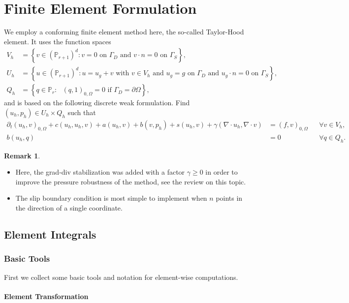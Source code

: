 \documentclass[a4paper,
		     12pt,
		     DIV10,
		     DIVcalc,
		     headings=normal,
		     oneside,
		     bibliography=totoc,
		     headsepline=false,
		     headinclude]{scrartcl}
\theoremstyle{definition}
\newtheorem{Rem}[Def]{Remark}
\begin{document}
\section{Finite Element Formulation}

We employ a conforming finite element method here, the so-called Taylor-Hood element. It uses the function spaces
\begin{align}
V_h &= \left\{ v\in (\mathbb{P}_{r+1})^d : \text{$v=0$ on $\Gamma_D$ and $v\cdot n=0$ on $\Gamma_S$} \right\},\\
U_h &= \left\{ u\in (\mathbb{P}_{r+1})^d : \text{$u=u_g+v$ with $v\in V_h$ and $u_g=g$ on $\Gamma_D$ and $u_g\cdot n=0$ on $\Gamma_S$} \right\},\\
Q_h &= \left\{ q\in \mathbb{P}_r : \text{ $(q,1)_{0,\Omega}=0$ if $\Gamma_D=\partial\Omega$} \right\},
\end{align}
and is based on the following discrete weak formulation. Find $(u_h,p_h)\in U_h\times Q_h$ such that
\begin{align}
\partial_t (u_h,v)_{0,\Omega} + c(u_h,u_h,v) + a(u_h,v) + b(v,p_h) + s(u_h,v) + \gamma (\nabla\cdot u_h, \nabla\cdot v) &= (f,v)_{0,\Omega} &&\forall v\in V_h,\\
b(u_h,q) &= 0 &&\forall q\in Q_h.
\end{align}
\begin{Rem}
\begin{itemize}
\item Here, the grad-div stabilization was added with a factor $\gamma\geq 0$ in order to improve the pressure
robustness of the method, see the review \cite{John_etal_2017} on this topic.
\item The slip boundary condition is most simple to implement when $n$ points in the direction of a single coordinate.
\end{itemize}
\end{Rem}

\subsection{Element Integrals}

\subsubsection*{Basic Tools} First we collect some basic tools and notation for element-wise computations.

\paragraph{Element Transformation}
\end{document}
